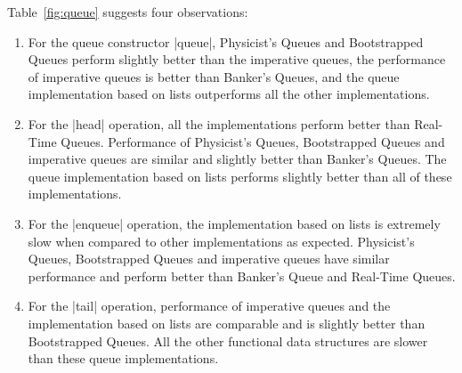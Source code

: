 



\noindent
Table~\ref{fig:queue} suggests four observations:
\begin{enumerate}
\item{For the queue constructor \scheme|queue|, Physicist's Queues and
  Bootstrapped Queues perform slightly better than the imperative
  queues, the performance of imperative queues is better than Banker's
  Queues, and the queue implementation based on lists outperforms all
  the other implementations.}
\item{For the \scheme|head| operation, all the implementations perform
  better than Real-Time Queues. Performance of Physicist's Queues,
  Bootstrapped Queues and imperative queues are similar and slightly
  better than Banker's Queues. The queue implementation based on lists
  performs slightly better than all of these implementations.}
\item{For the \scheme|enqueue| operation, the implementation based on
  lists is extremely slow when compared to other implementations as
  expected. Physicist's Queues, Bootstrapped Queues and imperative
  queues have similar performance and perform better than Banker's Queue and
  Real-Time Queues.}
\item{For the \scheme|tail| operation, performance of imperative queues
  and the implementation based on lists are comparable and is slightly
  better than Bootstrapped Queues. All the other functional data
  structures are slower than these queue implementations.}
\end{enumerate}



